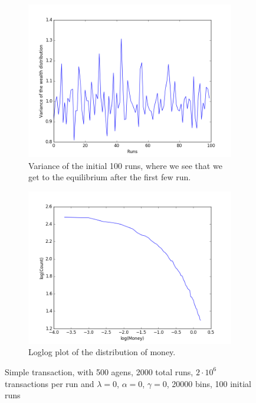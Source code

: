 \documentclass[a4paper,11pt]{article}
\begin{document}
{\begin{figure}[H]
	\centering
	\begin{subfigure}[t]{0.45\textwidth}
		\includegraphics[scale=0.4]{propersimpleinit}
		\caption{Variance of the initial 100 runs, where we see that we get to the equilibrium after the first few run.}
		\label{fig:propersimpleinit}
	\end{subfigure}
	\begin{subfigure}[t]{0.45\textwidth}
		\includegraphics[scale=0.4]{Proper_simple_transaction_log}
		\caption{Loglog plot of the distribution of money. }
		\label{fig:Proper_simple_transaction_log}
	\end{subfigure}
	\caption{Simple transaction, with 500 agens, 2000 total runs, $2\cdot 10^{6}$ transactions per run and  $\lambda=0$, $\alpha=0$, $\gamma=0$, 20000 bins, 100 initial runs}
	\label{fig:simple}
\end{figure}


}
\end{document}
